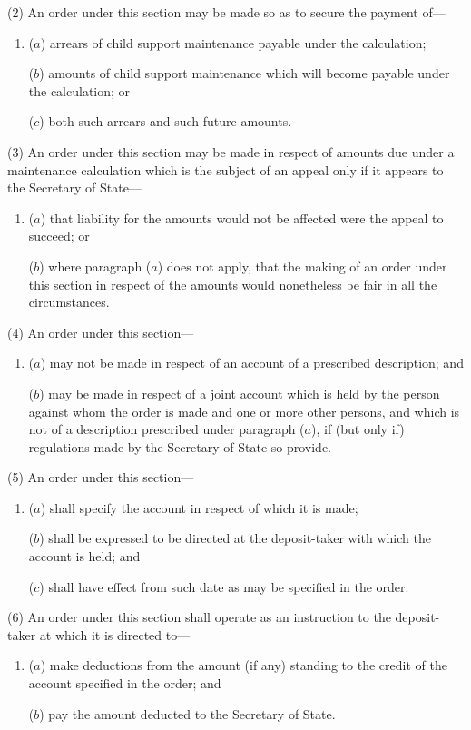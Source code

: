\documentclass[12pt,a4paper]{article}
\begin{document}
(2) An order under this section may be made so as to secure the payment of---
\begin{enumerate}\item[]
($a$) arrears of child support maintenance payable under the calculation;

($b$) amounts of child support maintenance which will become payable under the
calculation; or

($c$) both such arrears and such future amounts.
\end{enumerate}

(3) An order under this section may be made in respect of amounts due under a maintenance calculation which is the subject of an appeal only if it appears to the Secretary of State---
\begin{enumerate}\item[]
($a$) that liability for the amounts would not be affected were the appeal to succeed;
or

($b$) where paragraph ($a$) does not apply, that the making of an order under this
section in respect of the amounts would nonetheless be fair in all the
circumstances.
\end{enumerate}

(4) An order under this section---
\begin{enumerate}\item[]
($a$) may not be made in respect of an account of a prescribed description; and

($b$) may be made in respect of a joint account which is held by the person against whom the order is made and one or more other persons, and which is not of a description prescribed under paragraph ($a$), if (but only if) regulations made by the Secretary of State so provide.
\end{enumerate}

(5) An order under this section---
\begin{enumerate}\item[]
($a$) shall specify the account in respect of which it is made;

($b$) shall be expressed to be directed at the deposit-taker with which the account is held; and

($c$) shall have effect from such date as may be specified in the order.
\end{enumerate}

(6) An order under this section shall operate as an instruction to the deposit-taker at which it is directed to---
\begin{enumerate}\item[]
($a$) make deductions from the amount (if any) standing to the credit of the account specified in the order; and

($b$) pay the amount deducted to the Secretary of State.
\end{enumerate}
\end{document}
